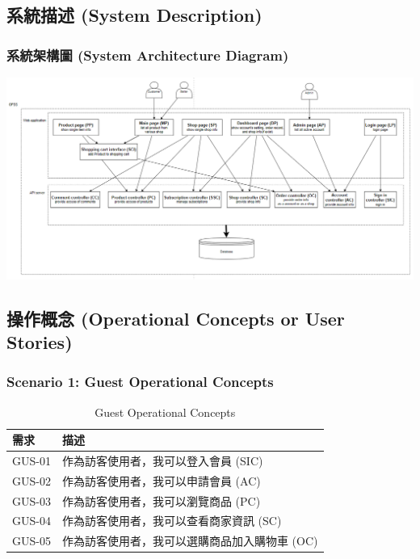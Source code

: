 \documentclass[a4paper, 12pt]{article}
\begin{document}
\subsection{系統描述 (System Description)}
\subsubsection{系統架構圖 (System Architecture Diagram) }
\begin{center}
\includegraphics[scale=0.6]{image/C4model.png}
\end{center}

\subsection{操作概念 (Operational Concepts or User Stories)}
\subsubsection{Scenario 1: Guest Operational Concepts}
\begin{table}[h]
    \centering
    \renewcommand{\arraystretch}{1.35}
    \begin{tabular}{|p{3cm}|p{10cm}|}
        \hline
        \textbf{需求} & \textbf{描述} \\
        \hline
        GUS-01 & 作為訪客使用者，我可以登入會員 (SIC) \\
        \hline
        GUS-02 & 作為訪客使用者，我可以申請會員 (AC) \\
        \hline
        GUS-03 & 作為訪客使用者，我可以瀏覽商品 (PC) \\
        \hline
        GUS-04 & 作為訪客使用者，我可以查看商家資訊 (SC) \\
        \hline
        GUS-05 & 作為訪客使用者，我可以選購商品加入購物車 (OC) \\
        \hline
    \end{tabular}
    \caption{Guest Operational Concepts}
    \label{tab:guest-operational-concepts}
\end{table}
\newpage
\end{document}
